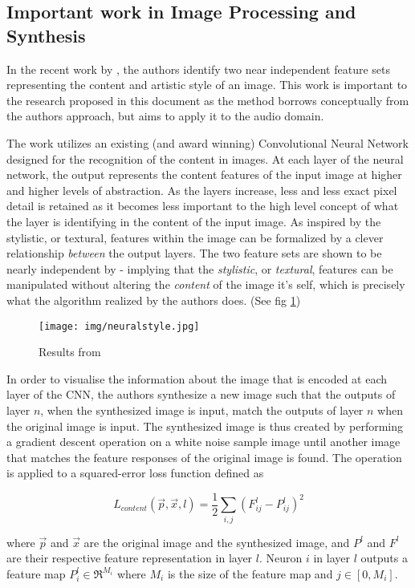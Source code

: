 \documentclass[12pt]{article}
\begin{document}
\subsection{Important work in Image Processing and Synthesis}
In the recent work by \citet{gatys2015neural}, the authors identify two near independent feature sets representing the content and artistic style of an image. This work is important to the research proposed in this document as the method borrows conceptually from the authors approach, but aims to apply it to the audio domain.

The work utilizes an existing (and award winning) Convolutional Neural Network designed for the recognition of the content in images. At each layer of the neural network, the output represents the content features of the input image at higher and higher levels of abstraction. As the layers increase, less and less exact pixel detail is retained as it becomes less important to the high level concept of what the layer is identifying in the content of the input image. As inspired by \citet{gatys2015texture} the stylistic, or textural, features within the image can be formalized by a clever relationship \emph{between} the output layers. The two feature sets are shown to be nearly independent by \citet{gatys2015neural} - implying that the \emph{stylistic}, or \emph{textural}, features can be manipulated without altering the \emph{content} of the image it's self, which is precisely what the algorithm realized by the authors does. (See fig \ref{fig:neurlstyle})

\begin{figure}
  \texttt{[image: img/neuralstyle.jpg]}
  \caption{Results from \citet{gatys2015neural}}
  \label{fig:neurlstyle}
\end{figure}

In order to visualise the information about the image that is encoded at each layer of the CNN, the authors synthesize a new image such that the outputs of layer $n$, when the synthesized image is input, match the outputs of layer $n$ when the original image is input. The synthesized image is thus created by performing a gradient descent operation on a white noise sample image until another image that matches the feature responses of the original image is found. The operation is applied to a squared-error loss function defined as

$$L_{content}(\vec{p}, \vec{x}, l) = \frac{1}{2}\sum_{i,j}(F^{l}_{ij} - P^{l}_{ij})^2$$

where $\vec{p}$ and $\vec{x}$ are the original image and the synthesized image, and $P^l$ and $F^l$ are their respective feature representation in layer $l$. Neuron $i$ in layer $l$ outputs a feature map $P^{l}_{i} \in \Re^{M_i}$ where $M_i$ is the size of the feature map and $j \in [0, M_i]$.
\end{document}
